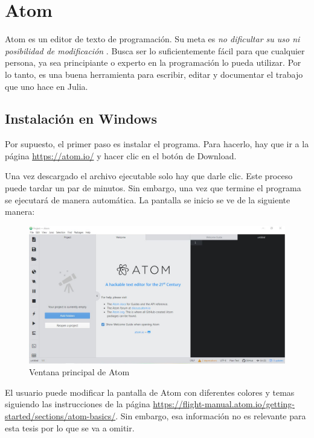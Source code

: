 \section{Atom}
Atom es un editor de texto de programación. Su meta es \textit{no dificultar su uso ni posibilidad de modificación} \citep{ATOM}.  Busca ser lo suficientemente fácil para que cualquier persona, ya sea principiante o experto en la programación lo pueda utilizar. Por lo tanto, es una buena herramienta para escribir, editar y documentar el trabajo que uno hace en Julia. 

\subsection{Instalación en Windows} 
Por supuesto, el primer paso es instalar el programa. Para hacerlo, hay que ir a la página \url{https://atom.io/} y hacer clic en el botón de \textsf{Download}. 

Una vez descargado el archivo ejecutable solo hay que darle clic. Este proceso puede tardar un par de minutos. Sin embargo, una vez que termine el programa se ejecutará de manera automática. La pantalla se inicio se ve de la siguiente manera:

\begin{figure}[h]
\begin{center}
\includegraphics[scale=0.45]{Imagenes/atom_main_window.JPG}
 \caption{Ventana principal de Atom}
  \label{main_atom}
\end{center}
\end{figure}

El usuario puede modificar la pantalla de Atom con diferentes colores y temas siguiendo las instrucciones de la página \url{https://flight-manual.atom.io/getting-started/sections/atom-basics/}. Sin embargo, esa información no es relevante para esta tesis por lo que se va a omitir. 


